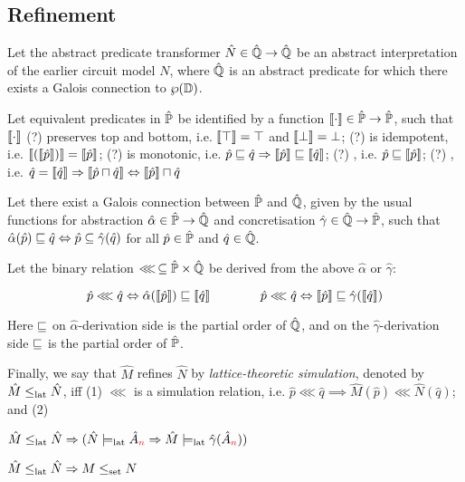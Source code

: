 \subsection{Refinement}

Let the abstract predicate transformer $\hat N \in \hat{\mathbb{Q}} \rightarrow \hat{\mathbb{Q}}$ be an abstract interpretation of the earlier circuit model $N$, where $\hat{\mathbb{Q}}$ is an abstract predicate for which there exists a Galois connection to $\wp(\mathbb{D})$.

Let equivalent predicates in $\hat{\mathbb{P}}$ be identified by a function $\llbracket \cdot \rrbracket \in \hat{\mathbb{P}} \rightarrow \hat{\mathbb{P}}$, such that $\llbracket \cdot \rrbracket$ (?) preserves top and bottom, i.e. $\llbracket \top \rrbracket = \top$ and $\llbracket \bot \rrbracket = \bot$; (?) is idempotent, i.e. $\llbracket (\llbracket \hat p \rrbracket) \rrbracket = \llbracket \hat p \rrbracket$; (?) is monotonic, i.e. $\hat p \sqsubseteq \hat q \Rightarrow \llbracket \hat p \rrbracket \sqsubseteq \llbracket \hat q \rrbracket$; (?) , i.e. $\hat p \sqsubseteq \llbracket \hat p \rrbracket$; (?) , i.e. $\hat q = \llbracket \hat q \rrbracket \Rightarrow \llbracket \hat p \sqcap \hat q \rrbracket \Leftrightarrow \llbracket \hat p \rrbracket \sqcap \hat q$

Let there exist a Galois connection between $\hat{\mathbb{P}}$ and $\hat{\mathbb{Q}}$, given by the usual functions for abstraction $\hat \alpha \in \hat{\mathbb{P}} \rightarrow \hat{\mathbb{Q}}$ and concretisation $\hat \gamma \in \hat{\mathbb{Q}} \rightarrow \hat{\mathbb{P}}$, such that $\hat \alpha(\hat p) \sqsubseteq \hat q \Leftrightarrow \hat p \subseteq \hat \gamma(\hat q)$ for all $\hat p \in \hat{\mathbb{P}}$ and $\hat q \in \hat{\mathbb{Q}}$.

Let the binary relation $\lll \, \subseteq \hat{\mathbb{P}} \times \hat{\mathbb{Q}}$ be derived from the above $\hat \alpha$ or $\hat \gamma$:

\begin{equation*}
\hat p \lll \hat q \Leftrightarrow \hat \alpha(\llbracket \hat p \rrbracket) \sqsubseteq \llbracket \hat q \rrbracket \quad\quad\quad\quad \hat p \lll \hat q \Leftrightarrow \llbracket \hat p \rrbracket \sqsubseteq \hat \gamma(\llbracket \hat q \rrbracket)
\end{equation*}

\noindent Here $\sqsubseteq$ on $\hat \alpha$-derivation side is the partial order of $\hat{\mathbb{Q}}$, and on the $\hat \gamma$-derivation side $\sqsubseteq$ is the partial order of $\hat{\mathbb{P}}$.

Finally, we say that $\hat M$ refines $\hat N$ by \textit{lattice-theoretic simulation}, denoted by $\hat M \leq_{\textrm{lat}} \hat N$, iff (1) $\lll$ is a simulation relation, i.e. $\hat p \lll \hat q \implies \hat M(\hat p) \lll \hat N(\hat q)$; and (2) 


\begin{theorem} \label{thm:lat-refines}
$\hat M \leq_{\textrm{lat}} \hat N \Rightarrow (\hat N \models_{\textrm{lat}} \hat{A}_{\textcolor{red}{n}} \Rightarrow \hat M \models_{\textrm{lat}} \hat \gamma(\hat{A}_{\textcolor{red}{n}}))$
\end{theorem}

\begin{theorem} \label{thm:lat-imply-set}
$\hat M \leq_{\textrm{lat}} \hat N \Rightarrow M \leq_{\textrm{set}} N$
\end{theorem}
